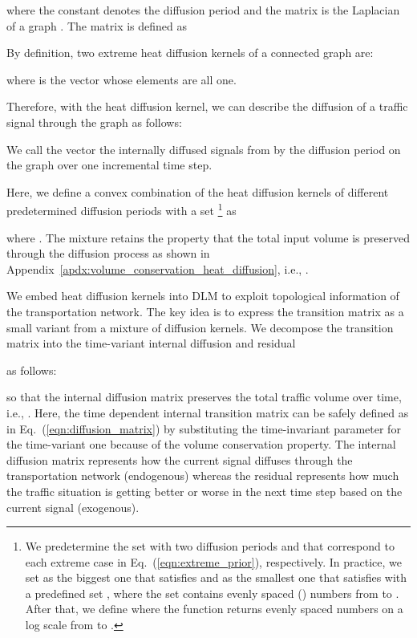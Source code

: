\documentclass[journal]{IEEEtran}
\makeatletter
\DeclareRobustCommand{\stopchange}{\@bsphack
  \normalcolor
  \@esphack
}
\makeatother
\begin{document}
where the constant  denotes the diffusion period and the matrix  is the Laplacian of a graph . The matrix is defined as




By definition, two extreme heat diffusion kernels of a connected graph  are:

where  is the vector whose elements are all one.

Therefore, with the heat diffusion kernel, we can describe the diffusion of a traffic signal through the graph  as follows: 

We call the vector  the internally diffused signals from  by the diffusion period  on the graph  over one incremental time step.

Here, we define a convex combination of the heat diffusion kernels of  different predetermined diffusion periods with a set \footnote{We predetermine the set  with two diffusion periods  and  that correspond to each extreme case in Eq.~(\ref{eqn:extreme_prior}), respectively. In practice, we set  as the biggest one that satisfies  and  as the smallest one that satisfies  with a predefined set , where the set contains evenly spaced () numbers from  to .
After that, we define
 where the function returns  evenly spaced numbers on a log scale from  to .} as

where .
The mixture retains the property that the total input volume is preserved through the diffusion process as shown in Appendix~\ref{apdx:volume_conservation_heat_diffusion}, i.e.,
.





We embed heat diffusion kernels into DLM to exploit topological information of the transportation network.
The key idea is to express the transition matrix as a small variant from a mixture of diffusion kernels.
We decompose the transition matrix into the time-variant internal diffusion and 
residual
\stopchange
as follows:

so that the internal diffusion matrix  preserves the total traffic volume over time, i.e., .
Here, the time dependent internal transition matrix can be safely defined as in Eq.~(\ref{eqn:diffusion_matrix}) by substituting the time-invariant parameter  for the time-variant one  because of the volume conservation property.
The internal diffusion matrix represents how the current signal  diffuses through the transportation network (endogenous) whereas
the residual represents how much the traffic situation is getting better or worse in the next time step based on the current signal (exogenous).
\end{document}
